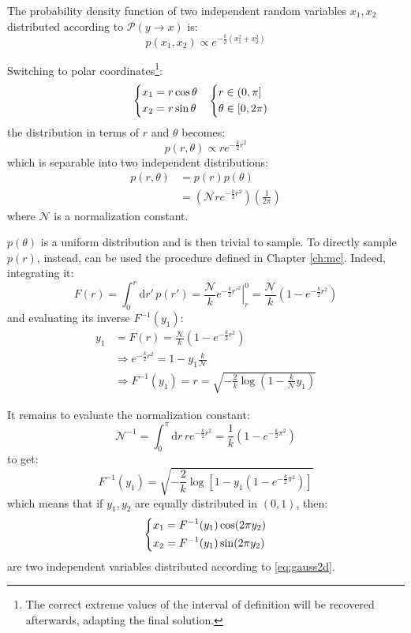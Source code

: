 The probability density function of two independent random variables $x_1,x_2$ distributed according to $\mathcal P(y\to x)$ is:
\begin{equation}\label{eq:gauss2d}
    p(x_1,x_2) \propto e^{-\frac{k}{2}(x_1^2+x_2^2)}
\end{equation}

Switching to polar coordinates\footnote{The correct extreme values of the interval of definition will be recovered afterwards, adapting the final solution.}:
\[\begin{aligned}
    &\begin{dcases}
        x_1 = r \cos\theta \\
        x_2 = r \sin\theta
    \end{dcases}
    &
    \begin{dcases}
        r \in (0,\pi] \\
        \theta \in [0,2\pi)
    \end{dcases}&
\end{aligned}\]
the distribution in terms of $r$ and $\theta$ becomes:
\[
    p(r,\theta) \propto re^{-\frac{k}{2}r^2}
\]
which is separable into two independent distributions:
\[\begin{aligned}
    p(r,\theta) &= p(r)p(\theta) \\
                &= \left(\mathcal Nre^{-\frac{k}{2}r^2}\right)\left(\frac{1}{2\pi}\right)
\end{aligned}\]
where $\mathcal N$ is a normalization constant.

$p(\theta)$ is a uniform distribution and is then trivial to sample.
To directly sample $p(r)$, instead, can be used the procedure defined in Chapter \ref{ch:mc}.
Indeed, integrating it:
\[
    F(r) = \int_0^r\mathrm dr'\,p(r') = \frac{\mathcal N}{k}\left.e^{-\frac{k}{2}{r'}^2}\right|_r^0 = \frac{\mathcal N}{k}\left(1-e^{-\frac{k}{2}r^2}\right)
\]
and evaluating its inverse $F^{-1}(y_1)$:
\[\begin{aligned}
    y_1 &= F(r) = \frac{\mathcal N}{k}\left(1-e^{-\frac{k}{2}r^2}\right) \\
        &\Rightarrow e^{-\frac{k}{2}r^2} = 1 - y_1\frac{k}{\mathcal N} \\
        &\Rightarrow F^{-1}(y_1) = r = \sqrt{-\frac{2}{k}\log\left(1-\frac{k}{\mathcal N}y_1\right)}
\end{aligned}\]

It remains to evaluate the normalization constant:
\[
    \mathcal N^{-1} = \int_0^\pi\mathrm dr\,re^{-\frac{k}{2}r^2} = \frac{1}{k}\left(1-e^{-\frac{k}{2}\pi^2}\right)
\]
to get:
\[
    F^{-1}(y_1) = \sqrt{-\frac{2}{k}\log\left[1-y_1\left(1-e^{-\frac{k}{2}\pi^2}\right)\right]}
\]
which means that if $y_1, y_2$ are equally distributed in $(0,1)$, then:
\begin{equation*}
    \begin{dcases}
        x_1 = F^{-1}(y_1)\cos(2\pi y_2) \\
        x_2 = F^{-1}(y_1)\sin(2\pi y_2)
    \end{dcases}
\end{equation*}
are two independent variables distributed according to \eqref{eq:gauss2d}.

